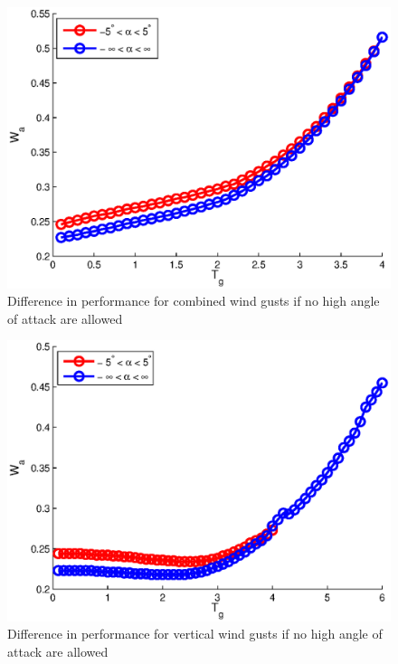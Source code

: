 \begin{figure}[h]
  \centering
 \includegraphics{./Figures/allowed_alpha_wg_tg_wt=3.eps}
  \caption{Difference in performance for combined wind gusts if no high angle of attack are allowed}
  \label{fig:allowed_alpha_Wt_vs_tg_wt=3}
\end{figure}

\begin{figure}[h]
  \centering
 \includegraphics{./Figures/allowed_alpha_wg_tg_wt=1.eps}
  \caption{Difference in performance for vertical wind gusts if no high angle of attack are allowed}
  \label{fig:allowed_alpha_Wt_vs_tg_wt=1}
\end{figure}

\FloatBarrier

